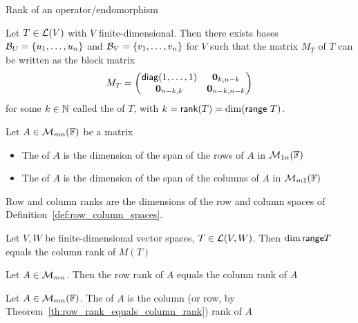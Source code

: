 \documentclass[aspectratio=169]{beamer}
\begin{document}
\begin{frame}{Rank of an operator/endomorphism}
    \begin{proposition}[Rank]
        Let $T\in\mathcal{L}(V)$ with $V$ finite-dimensional. Then there exists bases $\mathcal{B}_U=\{u_1,\ldots,u_n\}$ and $\mathcal{B}_V=\{v_1,\ldots,v_n\}$ for $V$ such that the matrix $M_T$ of $T$ can be written as the block matrix
        \[
        M_T=\begin{pmatrix}
            \diag(1,\ldots,1) & \b0_{k,n-k} \\
            \b0_{n-k,k} & \b0_{n-k,n-k}
        \end{pmatrix}
\]
        for some $k\in\mathbb{N}$ called the  of $T$, with $k=\mathsf{rank}(T)=\dim(\mathsf{range}\ T)$.
    \end{proposition}
\end{frame}

\begin{frame}
    \begin{definition}
        Let $A\in\mathcal{M}_{mn}(\mathbb{F})$ be a matrix
        \begin{itemize}
            \item The  of $A$ is the dimension of the span of the rows of $A$ in $\mathcal{M}_{1n}(\mathbb{F})$
            \item The  of $A$ is the dimension of the span of the columns of $A$ in $\mathcal{M}_{m1}(\mathbb{F})$
        \end{itemize}
    \end{definition}
    Row and column ranks are the dimensions of the row and column spaces of Definition~\ref{def:row_column_spaces}.
\end{frame}

\begin{frame}
    \begin{theorem}
        Let $V,W$ be finite-dimensional vector spaces, $T\in\mathcal{L}(V,W)$. Then $\dim\mathsf{range} T$ equals the column rank of $M(T)$
    \end{theorem}
    \vfill
    \begin{theorem}\label{th:row_rank_equals_column_rank}
        Let $A\in\mathcal{M}_{mn}$. Then the row rank of $A$ equals the column rank of $A$
    \end{theorem}
    \vfill
    \begin{definition}[Rank]
        Let $A\in\mathcal{M}_{mn}(\mathbb{F})$. The  of $A$ is the column (or row, by Theorem~\ref{th:row_rank_equals_column_rank}) rank of $A$
    \end{definition}
\end{frame}
\end{document}
